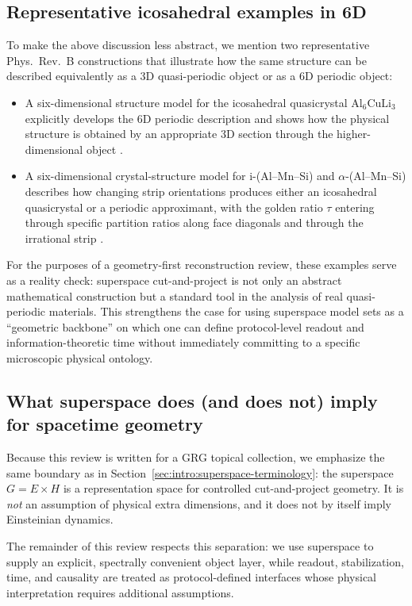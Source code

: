 \subsection{Representative icosahedral examples in 6D}\label{sec:superspace:examples}

To make the above discussion less abstract, we mention two representative Phys.\ Rev.\ B constructions that illustrate how the same structure can be described equivalently as a 3D quasi-periodic object or as a 6D periodic object:
\begin{itemize}[leftmargin=*,itemsep=2pt]
  \item A six-dimensional structure model for the icosahedral quasicrystal ${\mathrm{Al}}_{6}{\mathrm{CuLi}}_{3}$ explicitly develops the 6D periodic description and shows how the physical structure is obtained by an appropriate 3D section through the higher-dimensional object \cite{PRB43_929}.
  \item A six-dimensional crystal-structure model for i-(Al--Mn--Si) and $\alpha$-(Al--Mn--Si) describes how changing strip orientations produces either an icosahedral quasicrystal or a periodic approximant, with the golden ratio $\tau$ entering through specific partition ratios along face diagonals and through the irrational strip \cite{PRB46_6091}.
\end{itemize}

For the purposes of a geometry-first reconstruction review, these examples serve as a reality check: superspace cut-and-project is not only an abstract mathematical construction but a standard tool in the analysis of real quasi-periodic materials. This strengthens the case for using superspace model sets as a ``geometric backbone'' on which one can define protocol-level readout and information-theoretic time without immediately committing to a specific microscopic physical ontology.

\subsection{What superspace does (and does not) imply for spacetime geometry}\label{sec:superspace:spacetime}

Because this review is written for a GRG topical collection, we emphasize the same boundary as in Section~\ref{sec:intro:superspace-terminology}: the superspace $G=E\times H$ is a representation space for controlled cut-and-project geometry. It is \emph{not} an assumption of physical extra dimensions, and it does not by itself imply Einsteinian dynamics.

The remainder of this review respects this separation: we use superspace to supply an explicit, spectrally convenient object layer, while readout, stabilization, time, and causality are treated as protocol-defined interfaces whose physical interpretation requires additional assumptions.

